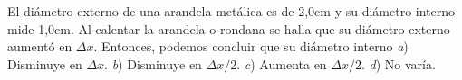 
El diámetro externo de una arandela metálica es de 2,0cm y su diámetro interno mide 1,0cm. Al calentar la arandela o rondana se halla que su diámetro externo aumentó en $\Delta x$. Entonces, podemos concluir que su diámetro interno \textit{a}) Disminuye en $\Delta x$. \textit{b}) Disminuye en $\Delta x/2$. \textit{c}) Aumenta en $\Delta x/2$. \textit{d}) No varía.